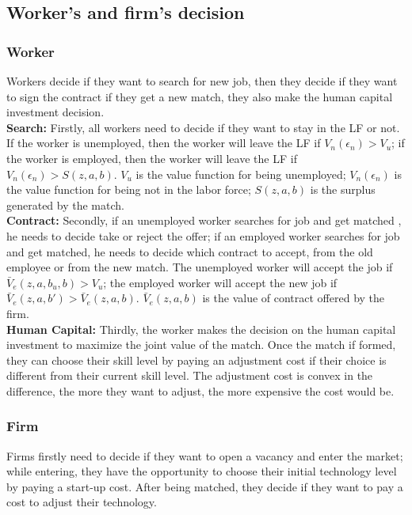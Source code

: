 \documentclass{article}
\newcommand{\1}{\mathbb{1}}
\begin{document}
\subsection{Worker's and firm's decision}
\subsubsection*{Worker} 
Workers decide if they want to search for new job, then they decide if they want to sign the contract if they get a new match, they also make the human capital investment decision. \\

\textbf{Search: }
Firstly, all workers need to decide if they want to stay in the LF or not. If the worker is unemployed, then the worker will leave the LF if $V_n(\epsilon_n)>V_u$; if the worker is employed, then the worker will leave the LF if $V_n(\epsilon_n)>S(z,a,b)$. $V_u$ is the value function for being unemployed; $V_n(\epsilon_n)$ is the value function for being not in the labor force; $S(z,a,b)$ is the surplus generated by the match.\\

\textbf{Contract: }
Secondly, if an unemployed worker searches for job and get matched , he needs to decide take or reject the offer; if an employed worker searches for job and get matched, he needs to decide which contract to accept, from the old employee or from the new match. The unemployed worker will accept the job if $\bar{V}_e(z,a,b_u,b) > V_u$; the employed worker will accept the new job if $\bar{V}_e(z,a,b') > \bar{V}_e(z,a,b)$. $\bar{V}_e(z,a,b)$ is the value of contract offered by the firm. \\

\textbf{Human Capital: }
Thirdly, the worker makes the decision on the human capital investment to maximize the joint value of the match. Once the match if formed, they can choose their skill level by paying an adjustment cost if their choice is different from their current skill level. The adjustment cost is convex in the difference, the more they want to adjust, the more expensive the cost would be. 

\subsubsection*{Firm}
Firms firstly need to decide if they want to open a vacancy and enter the market; while entering, they have the opportunity to choose their initial technology level by paying a start-up cost. After being matched, they decide if they want to pay a cost to adjust their technology. \\
\end{document}

